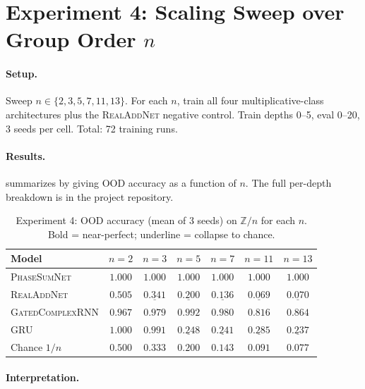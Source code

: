 \documentclass[11pt]{article}
\theoremstyle{definition}
\newcommand{\Z}{\mathbb{Z}}
\begin{document}
\section{Experiment 4: Scaling Sweep over Group Order $n$}
\label{sec:exp4}

\paragraph{Setup.} Sweep $n \in \{2, 3, 5, 7, 11, 13\}$. For each
$n$, train all four multiplicative-class architectures plus the
\textsc{RealAddNet} negative control. Train depths 0--5, eval 0--20,
3 seeds per cell. Total: 72 training runs.

\paragraph{Results.}  summarizes by giving
OOD accuracy as a function of $n$. The full per-depth breakdown is
in the project repository.

\begin{table}[h]
\centering
\caption{Experiment 4: OOD accuracy (mean of 3 seeds) on $\Z/n$ for
each $n$. Bold = near-perfect; underline = collapse to chance.}
\label{tab:exp4-results}
\setlength{\tabcolsep}{4pt}
\begin{tabular}{lcccccc}
\toprule
Model & $n=2$ & $n=3$ & $n=5$ & $n=7$ & $n=11$ & $n=13$ \\
\midrule
\textsc{PhaseSumNet} & $\mathbf{1.000}$ & $\mathbf{1.000}$ & $\mathbf{1.000}$ & $\mathbf{1.000}$ & $\mathbf{1.000}$ & $\mathbf{1.000}$ \\
\textsc{RealAddNet} & $0.505$ & $\underline{0.341}$ & $\underline{0.200}$ & $\underline{0.136}$ & $\underline{0.069}$ & $\underline{0.070}$ \\
\textsc{GatedComplexRNN} & $0.967$ & $0.979$ & $0.992$ & $0.980$ & $0.816$ & $0.864$ \\
\textsc{GRU} & $\mathbf{1.000}$ & $0.991$ & $\underline{0.248}$ & $\underline{0.241}$ & $\underline{0.285}$ & $\underline{0.237}$ \\
\midrule
Chance $1/n$ & $0.500$ & $0.333$ & $0.200$ & $0.143$ & $0.091$ & $0.077$ \\
\bottomrule
\end{tabular}
\end{table}

\paragraph{Interpretation.}
\end{document}
